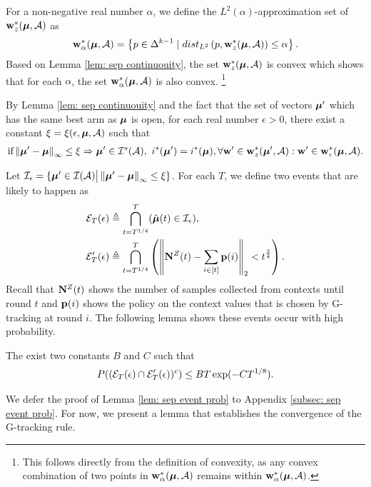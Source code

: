     For a non-negative real number $\alpha$, we define the $L^2(\alpha)$-approximation set of $\mathbf{w}_z^*(\boldsymbol{\mu}, \mathcal{A})$ as 
    \begin{align*}
        \mathbf{w}^*_{\alpha}(\boldsymbol{\mu}, \mathcal{A}) = \left\{p \in \Delta^{k-1} \mid dist_{L^2}\left(p, \mathbf{w}_z^*(\boldsymbol{\mu}, \mathcal{A})\right) \leq \alpha \right \}.
    \end{align*}
    Based on Lemma \ref{lem: sep continuouity}, the set $\mathbf{w}_z^*(\boldsymbol{\mu}, \mathcal{A})$ is convex which shows that for each $\alpha$, the set $\mathbf{w}^*_{\alpha}(\boldsymbol{\mu}, \mathcal{A})$ is also convex. \footnote{This follows directly from the definition of convexity, as any convex combination of two points in $\mathbf{w}^*_{\alpha}(\boldsymbol{\mu}, \mathcal{A})$ remains within $\mathbf{w}^*_{\alpha}(\boldsymbol{\mu}, \mathcal{A})$.}

    
    By Lemma \ref{lem: sep continuouity} and the fact that the set of vectors $\boldsymbol{\mu}'$ which has the same best arm as $\boldsymbol{\mu}$ is open, for each real number $\epsilon > 0$, there exist a constant $\xi = \xi(\epsilon, \boldsymbol{\mu}, \mathcal{A})$ such that 
    \begin{align*}
        \text{if} \left\Vert \boldsymbol{\mu}' - \boldsymbol{\mu} \right\Vert _{\infty} \leq \xi \Rightarrow \boldsymbol{\mu}' \in \mathcal{I}^s(\mathcal{A}), ~  i^*(\boldsymbol{\mu}') = i^*(\boldsymbol{\mu}), \forall \mathbf{w}' \in \mathbf{w}_z^*(\boldsymbol{\mu}', \mathcal{A}): \mathbf{w}' \in \mathbf{w}^*_{\epsilon}(\boldsymbol{\mu}, \mathcal{A}). 
    \end{align*}  

    Let $\mathcal{I}_{\epsilon} = \{ \boldsymbol{\mu}' \in \mathcal{I}(\mathcal{A}) \big| \left\Vert \boldsymbol{\mu}' - \boldsymbol{\mu} \right\Vert _{\infty} \leq \xi \}$. For each $T$, we define two events that are likely to happen as
    \begin{align*}
        &\mathcal{E}_T(\epsilon) \triangleq \bigcap_{t = T^{1/4}}^T (\hat{\boldsymbol{\mu}}(t) \in \mathcal{I}_{\epsilon}), \\ 
        &\mathcal{E}'_T(\epsilon) \triangleq \bigcap_{t = T^{1/4}}^T \left( \left\Vert {\mathbf{N}^{Z}(t)} - {\sum_{i \in [t]} \mathbf{p}(i)} \right\Vert _{2} < t^{\frac34} \right).
    \end{align*}
    Recall that $\mathbf{N}^{Z}(t)$ shows the number of samples collected from contexts until round $t$ and $\mathbf{p}(i)$ shows the policy on the context values that is chosen by G-tracking at round $i$. The following lemma shows these events occur with high probability.

    \begin{lemma} \label{lem: sep event prob}
        The exist two constants $B$ and $C$ such that
        \begin{align*}
            P((\mathcal{E}_T(\epsilon) \cap \mathcal{E}'_T(\epsilon))^c) \leq BT \exp(-CT^{1/8}).
        \end{align*}
    \end{lemma}

    We defer the proof of Lemma \ref{lem: sep event prob} to Appendix \ref{subsec: sep event prob}. For now, we present a lemma that establishes the convergence of the G-tracking rule.

